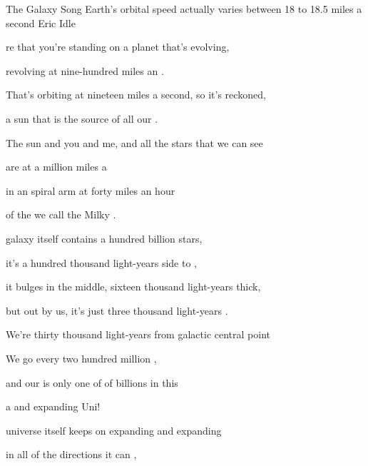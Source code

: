 \begin{SBSong}{The Galaxy Song}
  {Earth's orbital speed actually varies between 18 to 18.5 miles a second}
  {Eric Idle}
  \begin{SBVerse}
     re that you're standing on a planet that's evolving,

    revolving at nine-hundred miles an .

    That's orbiting at nineteen miles a second, so it's reckoned,

    a sun that is the source of all our .

    The sun and you and me, and all the stars that we can see

    are  at a million miles a 

    in an  spiral arm at forty  miles an hour

    of the  we call the Milky .
  \end{SBVerse}
  \begin{SBVerse}
     galaxy itself contains a hundred billion stars,

    it's a hundred thousand light-years side to ,

    it bulges in the middle, sixteen thousand light-years thick,

    but out by us, it's just three thousand light-years .

    We're thirty thousand light-years from galactic central point

    We go  every two hundred million ,

    and our  is only one of  of billions in this

    a and expanding Uni!
  \end{SBVerse}
  \CBPageBrk
  \begin{SBVerse}
     universe itself keeps on expanding and expanding

    in all of the directions it can ,


\end{SBVerse}
\end{SBSong}
